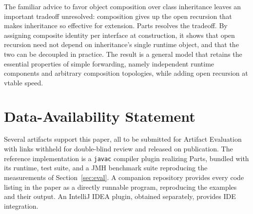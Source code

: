 \documentclass[acmsmall,screen,review,anonymous]{acmart}
\theoremstyle{acmplain}
\newcommand{\code}[1]{\texttt{#1}}
\begin{document}
The familiar advice to favor object composition over class inheritance leaves an important tradeoff unresolved: composition
gives up the open recursion that makes inheritance so effective for extension. Parts resolves the tradeoff. By assigning
composite identity per interface at construction, it shows that open recursion need not depend on inheritance's single runtime
object, and that the two can be decoupled in practice. The result is a general model that retains the essential properties
of simple forwarding, namely independent runtime components and arbitrary composition topologies, while adding open recursion
at vtable speed.


\section*{Data-Availability Statement}

Several artifacts support this paper, all to be submitted for Artifact Evaluation with links withheld for double-blind review and
released on publication. The reference implementation is a \code{javac} compiler plugin realizing Parts, bundled with its
runtime, test suite, and a JMH benchmark suite reproducing the measurements of Section~\ref{sec:eval}. A companion repository
provides every code listing in the paper as a directly runnable program, reproducing the examples and their output. An IntelliJ
IDEA plugin, obtained separately, provides IDE integration.

\end{document}
